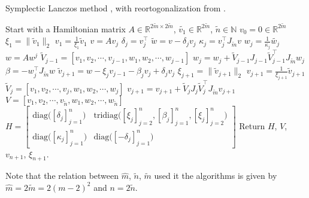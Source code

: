 \begin{algorithm} \caption{Symplectic Lanczos method \cite{SLM}, with reortogonalization from \cite{SLMO}. } \label{alg:symlanz}
\begin{algorithmic}
\STATE Start with a Hamiltonian matrix $A \in \mathbb{R}^{2\tilde{m} \times 2 \tilde{m}}$, $\tilde{v_1} \in \mathbb{R}^{2 \tilde{m}}$, $\tilde{n} \in \mathbb{N}$
\STATE $v_0= 0 \in \mathbb{R}^{2 \tilde{m}}$
\STATE $\xi_1 = \| \tilde{v}_1\|_2$
\STATE $v_1= \frac{1}{\xi_1}  \tilde{v}_1$
	\STATE $v = A v_j$
	\STATE $\delta_j =  v_j^\top$
	\STATE $\tilde{w} = v-\delta_j v_j$
	\STATE $\kappa_j = v_j^\top J_{\tilde{m}} v $
	\STATE $w_j = \frac{1}{\kappa_j} \tilde{w_j}$
	\STATE $w = A w^j$
	\STATE $ \tilde{V}_{j-1} = [v_1,v_2,\cdots,v_{j-1},w_1,w_2,\cdots,w_{j-1}] $
	\STATE $ w_j = w_j + \tilde{V}_{j-1}J_{j-1} \tilde{V}_{j-1}^\top J_{\tilde{m}} w_j $
	\STATE $\beta = -w_j^\top J_{\tilde{m}} w$
	\STATE $\tilde{v}_{j+1} = w - \xi_j v_{j-1} - \beta_j v_j + \delta_j v_j$
	\STATE $ \xi_{j+1} = \|\tilde{v}_{j+1} \|_2 $
	\STATE $ v_{j+1} = \frac{1}{\xi_{j+1}} \tilde{v}_{j+1} $
	\STATE $ \tilde{V}_j = [v_1,v_2,\cdots,v_{j},w_1,w_2,\cdots,w_{j}] $
	\STATE $ v_{j+1} = v_{j+1} + \tilde{V}_j J_j \tilde{V}_j^\top J_{\tilde{m}} v_{j+1} $
\ENDFOR
\STATE $V = [v_1,v_2,\cdots,v_{\tilde{n}},w_1,w_2,\cdots,w_{\tilde{n}}]$
\STATE $H = \begin{bmatrix}
\text{diag} \big( [\delta_j]^n_{j=1} \big) & \text{tridiag}\big( [\xi_j]_{j=2}^n,[\beta_j]_{j=1}^n,[\xi_j]_{j=2}^n \big) \\
\text{diag} \big( [\kappa_j]^n_{j=1} \big) & \text{diag} \big( [-\delta_j]^n_{j=1} \big)
\end{bmatrix} $
\STATE Return $H$, $V$, $v_{n+1}$, $\xi_{n+1}$.
\end{algorithmic}
\end{algorithm}
Note that the relation between $\hat{m}$, $\tilde{n}$, $\tilde{m}$ used it the algorithms is given by $\hat{m} = 2\tilde{m}= 2(m-2)^2$ and $ n = 2\tilde{n}$.

